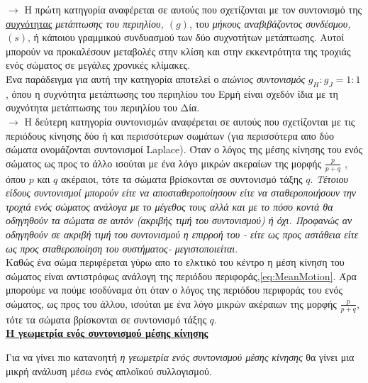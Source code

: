 $\rightarrow$ Η πρώτη κατηγορία αναφέρεται σε αυτούς που σχετίζονται με τον συντονισμό της \underline{συχνότητας} {\it μετάπτωσης του περιηλίου, $(g)$}, του {\it μήκους αναβιβάζοντος συνδέσμου, $(s)$}, ή κάποιου γραμμικού συνδυασμού των δύο συχνοτήτων μετάπτωσης. Αυτοί μπορούν να προκαλέσουν μεταβολές στην κλίση και στην εκκεντρότητα της τροχιάς ενός σώματος σε μεγάλες χρονικές κλίμακες.\\

Ένα παράδειγμα για αυτή την κατηγορία αποτελεί ο {\it αιώνιος συντονισμός} $g_H : g_J = 1:1$, όπου η συχνότητα μετάπτωσης του περιηλίου του Ερμή είναι σχεδόν ίδια με τη συχνότητα μετάπτωσης του περιηλίου του Δία.\\

$\rightarrow$ Η δεύτερη κατηγορία συντονισμών αναφέρεται σε αυτούς που σχετίζονται με τις περιόδους κίνησης δύο ή και περισσότερων σωμάτων (για περισσότερα απο δύο σώματα ονομάζονται συντονισμοί {\en Laplace}). Όταν ο λόγος της μέσης κίνησης του ενός σώματος ως προς το άλλο ισούται με ένα λόγο μικρών ακεραίων της μορφής $\frac{p}{p+q}$ , όπου $p$ και $q$ ακέραιοι, τότε τα σώματα βρίσκονται σε συντονισμό τάξης $q$. {\it Τέτοιου είδους συντονισμοί μπορούν είτε να αποσταθεροποίησουν είτε να σταθεροποιήσουν την τροχιά ενός σώματος ανάλογα με το μέγεθος τους αλλά και με το πόσο κοντά θα οδηγηθούν τα σώματα σε αυτόν (ακριβής τιμή του συντονισμού) ή όχι. Προφανώς αν οδηγηθούν σε ακριβή τιμή του συντονισμού η επιρροή του - είτε ως προς αστάθεια είτε ως προς σταθεροποίηση του συστήματος- μεγιστοποιείται}.\\


Καθώς ένα σώμα περιφέρεται γύρω απο το ελκτικό του κέντρο η μέση κίνηση του σώματος είναι αντιστρόφως ανάλογη της περιόδου περιφοράς,\eqref{eq:MeanMotion}. Άρα μπορούμε να πούμε ισοδύναμα ότι όταν ο λόγος της περιόδου περιφοράς του ενός σώματος, ως προς του άλλου, ισούται με ένα λόγο μικρών ακέραιων της μορφής $\frac{p}{p+q}$, τότε τα σώματα βρίσκονται σε συντονισμό τάξης $q$.\\


   \underline{{\bf H γεωμετρία ενός συντονισμού μέσης κίνησης}}
\vspace{0.3cm}

Για να γίνει πιο κατανοητή {\it η γεωμετρία ενός συντονισμού μέσης κίνησης} θα γίνει μια μικρή ανάλυση μέσω ενός απλοϊκού συλλογισμού.\\

